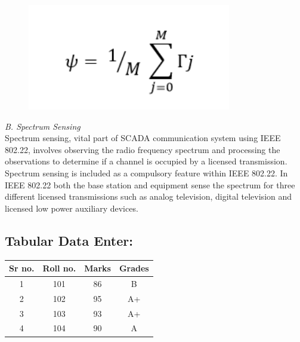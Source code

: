 \documentclass[conference]{IEEEtran}
\begin{document}
\begin{Summary - }
\vspace{1cm}


\begin{figure}[h!] %
  \centering
  \includegraphics[width=3.5in]{im3.png}\\
\end{figure}

\vspace{1cm}


\vspace{0.2cm}\emph{B. \hspace{0.3cm}Spectrum Sensing}\\
Spectrum sensing, vital part of SCADA communication
system using IEEE 802.22, involves observing the radio
frequency spectrum and processing the observations to
determine if a channel is occupied by a licensed transmission.
Spectrum sensing is included as a compulsory feature within
IEEE 802.22. In IEEE 802.22 both the base station and
equipment sense the spectrum for three different licensed
transmissions such as analog television, digital television and
licensed low power auxiliary devices.

\vspace{1cm}
\subsection{Tabular Data Enter:}

\begin{center}
\begin{tabular}{ |c|c|c|c| } 

\hline

\textbf{Sr no.   }&
\textbf{Roll no.   }&
\textbf{Marks }&
\textbf{Grades  }\\


 \hline
 1  &  101  &  86 & B \\
2  &  102  & 95 & A+ \\
3  &  103  &  93  & A+ \\
4  &  104  &  90  & A \\


\end{tabular}
\end{center}
\end{Summary - }
\end{document}
